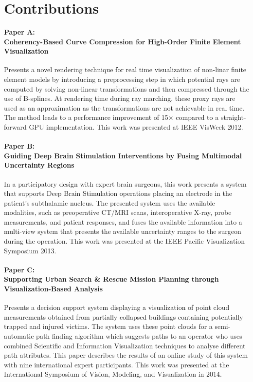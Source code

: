 \clearpg

\chapter*{Contributions}

\subsubsection{Paper A:\\Coherency-Based Curve Compression for High-Order Finite Element Visualization}
Presents a novel rendering technique for real time visualization of non-linar finite element models by introducing a preprocessing step in which potential rays are computed by solving non-linear transformations and then compressed through the use of B-splines. At rendering time during ray marching, these proxy rays are used as an approximation as the transformations are not achievable in real time. The method leads to a performance improvement of 15$\times$ compared to a straight-forward GPU implementation. This work was presented at IEEE VisWeek 2012.

\subsubsection{Paper B:\\Guiding Deep Brain Stimulation Interventions by Fusing Multimodal Uncertainty Regions}
In a participatory design with expert brain surgeons, this work presents a system that supports Deep Brain Stimulation operations placing an electrode in the patient's subthalamic nucleus. The presented system uses the available modalities, such as preoperative CT/MRI scans, interoperative X-ray, probe measurements, and patient responses, and fuses the available information into a multi-view system that presents the available uncertainty ranges to the surgeon during the operation. This work was presented at the IEEE Pacific Visualization Symposium 2013.

\subsubsection{Paper C:\\Supporting Urban Search \& Rescue Mission Planning through \\Visualization-Based Analysis}
Presents a decision support system displaying a  visualization of point cloud measurements obtained from partially collapsed buildings containing potentially trapped and injured victims. The system uses these point clouds for a semi-automatic path finding algorithm which suggests paths to an operator who uses combined Scientific and Information Visualization techniques to analyse different path attributes. This paper describes the results of an online study of this system with nine international expert participants. This work was presented at the International Symposium of Vision, Modeling, and Visualization in 2014.

